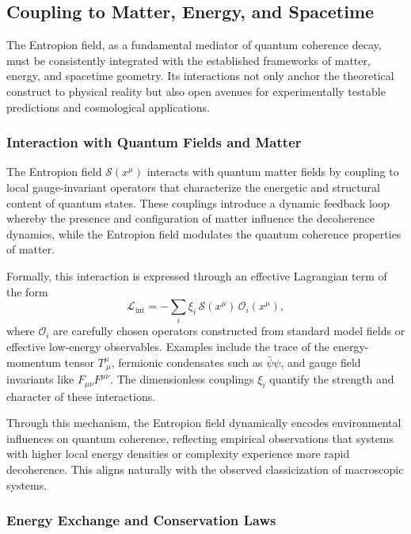 \documentclass[12pt]{article}
\begin{document}
\subsection{Coupling to Matter, Energy, and Spacetime}

The Entropion field, as a fundamental mediator of quantum coherence decay, must be consistently integrated with the established frameworks of matter, energy, and spacetime geometry. Its interactions not only anchor the theoretical construct to physical reality but also open avenues for experimentally testable predictions and cosmological applications.

\subsubsection*{Interaction with Quantum Fields and Matter}

The Entropion field $\mathcal{S}(x^\mu)$ interacts with quantum matter fields by coupling to local gauge-invariant operators that characterize the energetic and structural content of quantum states. These couplings introduce a dynamic feedback loop whereby the presence and configuration of matter influence the decoherence dynamics, while the Entropion field modulates the quantum coherence properties of matter.

Formally, this interaction is expressed through an effective Lagrangian term of the form
\begin{equation}
\mathcal{L}_\mathrm{int} = - \sum_i \xi_i \, \mathcal{S}(x^\mu) \, \mathcal{O}_i(x^\mu),
\end{equation}
where $\mathcal{O}_i$ are carefully chosen operators constructed from standard model fields or effective low-energy observables. Examples include the trace of the energy-momentum tensor $T^\mu_{\ \mu}$, fermionic condensates such as $\bar{\psi}\psi$, and gauge field invariants like $F_{\mu\nu}F^{\mu\nu}$. The dimensionless couplings $\xi_i$ quantify the strength and character of these interactions.

Through this mechanism, the Entropion field dynamically encodes environmental influences on quantum coherence, reflecting empirical observations that systems with higher local energy densities or complexity experience more rapid decoherence. This aligns naturally with the observed classicization of macroscopic systems.

\subsubsection*{Energy Exchange and Conservation Laws}
\end{document}
